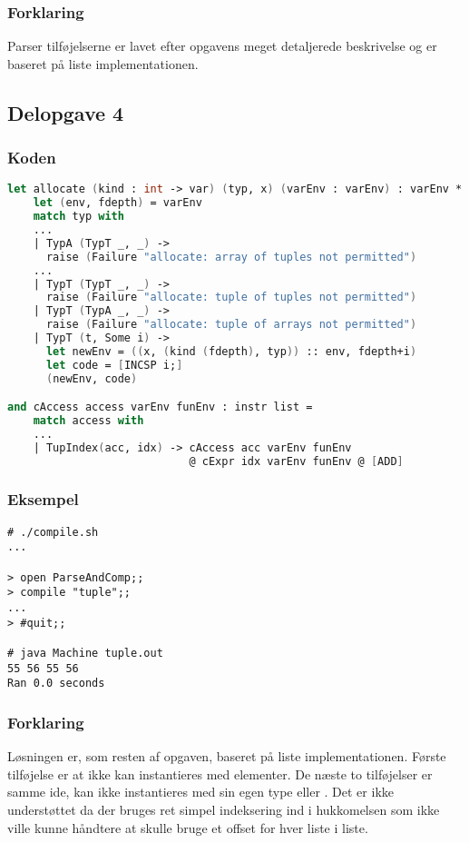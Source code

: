 \subsubsection{Forklaring}
Parser tilføjelserne er lavet efter opgavens meget detaljerede beskrivelse og er baseret på liste implementationen.

\subsection{Delopgave 4}\label{ass:3-4}
\subsubsection{Koden}
\begin{lstlisting}[language=fsharp]
let allocate (kind : int -> var) (typ, x) (varEnv : varEnv) : varEnv * instr list =
    let (env, fdepth) = varEnv 
    match typ with
    ...
    | TypA (TypT _, _) -> 
      raise (Failure "allocate: array of tuples not permitted")
    ...
    | TypT (TypT _, _) -> 
      raise (Failure "allocate: tuple of tuples not permitted")
    | TypT (TypA _, _) -> 
      raise (Failure "allocate: tuple of arrays not permitted")
    | TypT (t, Some i) ->
      let newEnv = ((x, (kind (fdepth), typ)) :: env, fdepth+i)  
      let code = [INCSP i;]
      (newEnv, code)

and cAccess access varEnv funEnv : instr list =
    match access with 
    ...
    | TupIndex(acc, idx) -> cAccess acc varEnv funEnv 
                            @ cExpr idx varEnv funEnv @ [ADD]
\end{lstlisting}

\subsubsection{Eksempel}
\begin{lstlisting}
# ./compile.sh
...

> open ParseAndComp;;
> compile "tuple";;
...
> #quit;;

# java Machine tuple.out
55 56 55 56
Ran 0.0 seconds
\end{lstlisting}

\subsubsection{Forklaring}
Løsningen er, som resten af opgaven, baseret på liste implementationen. Første tilføjelse er at  ikke kan instantieres med  elementer. De næste to tilføjelser er samme ide,  kan ikke instantieres med sin egen type eller . Det er ikke understøttet da der bruges ret simpel indeksering ind i hukkomelsen som ikke ville kunne håndtere at skulle bruge et offset for hver liste i liste.\\[1ex]

